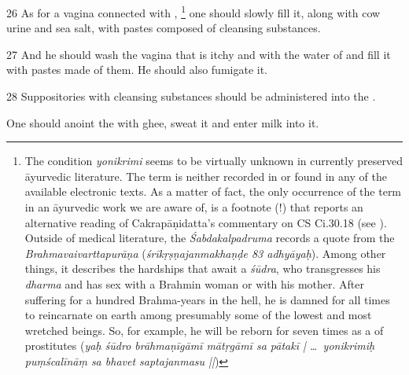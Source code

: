 \begin{translation}
\item [26]
As for a vagina connected with ,%
\footnote{%
The condition \textit{yonikrimi} seems to be virtually unknown in currently 
preserved  āyurvedic literature. The term is neither recorded in 
\textcite{josi-maha} or found in any of the available electronic texts. As a matter 
of fact, the only occurrence of the term in an āyurvedic work we are aware of, is a 
footnote (!) that reports an alternative reading of Cakrapāṇidatta's commentary 
on CS Ci.30.18 (see \textcite[635b]{cara-trikamji3}).
Outside of medical literature, the \textit{Śabdakalpadruma} records a quote from 
the \textit{Brahmavaivarttapurāṇa} (\textit{śrīkṛṣṇajanmakhaṇḍe 83 adhyāyaḥ}). 
Among other things, it describes the hardships that await a \textit{śūdra}, who 
transgresses his \textit{dharma} and has sex with a Brahmin woman or with his 
mother. After suffering for a hundred Brahma-years in the hell, he is damned for 
all times to reincarnate on earth among presumably some of the lowest and most 
wretched beings. So, for example, he will be reborn for seven times as a 
 of prostitutes (\textit{yaḥ śūdro brāhmaṇīgāmī 
mātṛgāmī sa pātakī | \ldots\ yonikrimiḥ puṃścalīnāṃ sa bhavet saptajanmasu 
||})     
} 
one should slowly fill it, along with cow urine and sea salt, with pastes composed 
of cleansing substances.

\item [27]
And he should wash the vagina that is itchy and  with the water of  and fill it with pastes 
made of them. He should also fumigate it.

\item [28]
Suppositories with cleansing substances should be administered into the 
.

One should anoint the  with ghee, sweat it and enter milk 
into it. 


\end{translation}
